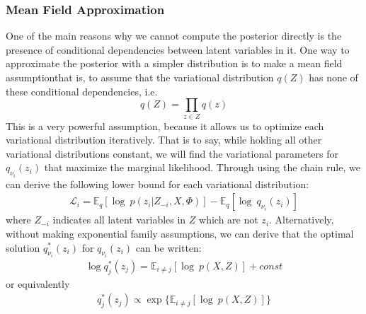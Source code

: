\documentclass[12pt,letterpaper]{article}
\begin{document}
\subsubsection{Mean Field Approximation} 
One of the main reasons why we cannot compute the posterior directly is the presence of conditional dependencies between latent variables in it. One way to approximate the posterior with a simpler distribution is to make a mean field assumption\textemdash that is, to assume that the variational distribution $q(Z)$ has none of these conditional dependencies, i.e. $$ q(Z) = \prod\limits_{z 
\in Z} q(z)$$ This is a very powerful assumption, because it allows us to optimize each variational distribution iteratively. That is to say, while holding all other variational distributions constant, we will find the variational parameters for $q_{\nu_i}(z_i)$ that maximize the marginal likelihood. Through using the chain rule, we can derive the following lower bound for each variational distribution:
\begin{align}
\mathcal{L}_i = \mathbb{E}_q[\log\ p(z_i| Z_{-i}, X, \Phi)] - \mathbb{E}_q[\log\ q_{\nu_i}(z_i)]
\end{align} 
where $Z_{-i}$ indicates all latent variables in $Z$ which are not $z_i$. Alternatively, without making exponential family assumptions, we can derive that the optimal solution $q^*_{\nu_i}(z_i)$ for $q_{\nu_i}(z_i)$ can be written:
\begin{align}
\log q^*_j(z_j) = \mathbb{E}_{i \neq j}[\log\ p(X,Z)] + const
\end{align}
or equivalently 
\begin{align}
q^*_j(z_j) \propto \exp\bigg\{ \mathbb{E}_{i \neq j}[\log\ p(X,Z)] \bigg\}
\end{align}
\end{document}
